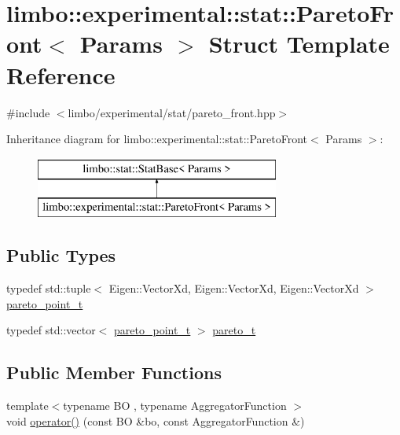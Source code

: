 \hypertarget{structlimbo_1_1experimental_1_1stat_1_1_pareto_front}{}\section{limbo\+:\+:experimental\+:\+:stat\+:\+:Pareto\+Front$<$ Params $>$ Struct Template Reference}
\label{structlimbo_1_1experimental_1_1stat_1_1_pareto_front}


{\ttfamily \#include $<$limbo/experimental/stat/pareto\+\_\+front.\+hpp$>$}

Inheritance diagram for limbo\+:\+:experimental\+:\+:stat\+:\+:Pareto\+Front$<$ Params $>$\+:\begin{figure}[H]
\begin{center}
\leavevmode
\includegraphics[height=2.000000cm]{structlimbo_1_1experimental_1_1stat_1_1_pareto_front}
\end{center}
\end{figure}
\subsection*{Public Types}
\begin{DoxyCompactItemize}
\item 
typedef std\+::tuple$<$ Eigen\+::\+Vector\+Xd, Eigen\+::\+Vector\+Xd, Eigen\+::\+Vector\+Xd $>$ \hyperlink{structlimbo_1_1experimental_1_1stat_1_1_pareto_front_a07a9d1b38b8c942ec0666841ec310ed8}{pareto\+\_\+point\+\_\+t}
\item 
typedef std\+::vector$<$ \hyperlink{structlimbo_1_1experimental_1_1stat_1_1_pareto_front_a07a9d1b38b8c942ec0666841ec310ed8}{pareto\+\_\+point\+\_\+t} $>$ \hyperlink{structlimbo_1_1experimental_1_1stat_1_1_pareto_front_ad43dd449215fa8e506851c3f7fc96940}{pareto\+\_\+t}
\end{DoxyCompactItemize}
\subsection*{Public Member Functions}
\begin{DoxyCompactItemize}
\item 
{\footnotesize template$<$typename B\+O , typename Aggregator\+Function $>$ }\\void \hyperlink{structlimbo_1_1experimental_1_1stat_1_1_pareto_front_a341b34d96290a874818bbdb4f27f9f2b}{operator()} (const B\+O \&bo, const Aggregator\+Function \&)
\end{DoxyCompactItemize}


